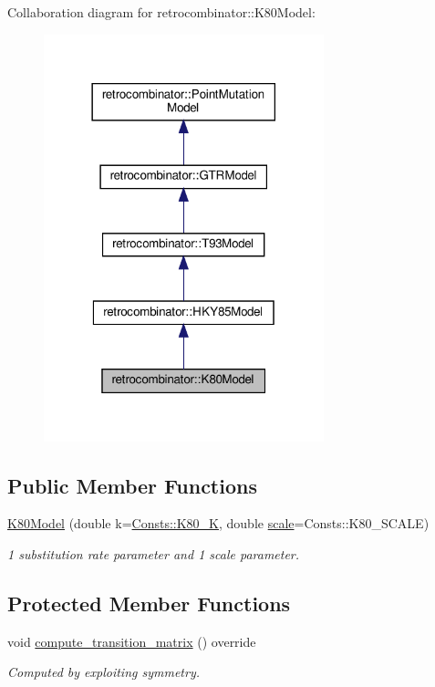Collaboration diagram for retrocombinator\+:\+:K80\+Model\+:
\nopagebreak
\begin{figure}[H]
\begin{center}
\leavevmode
\includegraphics[width=230pt]{classretrocombinator_1_1K80Model__coll__graph}
\end{center}
\end{figure}
\subsection*{Public Member Functions}
\begin{DoxyCompactItemize}
\item 
\hyperlink{classretrocombinator_1_1K80Model_af199581e9a4d387f5e9e4f5bd048904b}{K80\+Model} (double k=\hyperlink{namespaceretrocombinator_1_1Consts_ac72fd4ec7b9dc3b42523a83cd69eaee2}{Consts\+::\+K80\+\_\+K}, double \hyperlink{classretrocombinator_1_1PointMutationModel_a3258dfbdae0f2614cdc66f13ae028b46}{scale}=Consts\+::\+K80\+\_\+\+S\+C\+A\+LE)
\begin{DoxyCompactList}\small\item\em 1 substitution rate parameter and 1 scale parameter. \end{DoxyCompactList}\end{DoxyCompactItemize}
\subsection*{Protected Member Functions}
\begin{DoxyCompactItemize}
\item 
\mbox{\label{classretrocombinator_1_1K80Model_a70f669e2a31d34a37b19fd185219a9ce}} 
void \hyperlink{classretrocombinator_1_1K80Model_a70f669e2a31d34a37b19fd185219a9ce}{compute\+\_\+transition\+\_\+matrix} () override
\begin{DoxyCompactList}\small\item\em Computed by exploiting symmetry. \end{DoxyCompactList}\end{DoxyCompactItemize}

